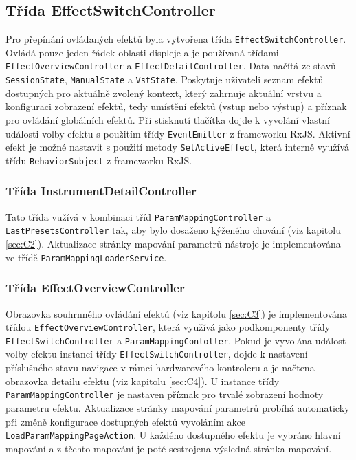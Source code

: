 \documentclass[thesis=M,czech]{FITthesis}[2019/03/06]
\begin{document}
			\subsection{Třída EffectSwitchController}
				Pro přepínání ovládaných efektů byla vytvořena třída \texttt{EffectSwitchController}. 
				Ovládá pouze jeden řádek oblasti displeje a je používaná třídami \texttt{EffectOverviewController} a \texttt{EffectDetailController}. Data načítá ze stavů \texttt{SessionState}, \texttt{ManualState} a \texttt{VstState}.
				Poskytuje uživateli seznam efektů dostupných pro aktuálně zvolený kontext, který zahrnuje aktuální vrstvu a konfiguraci
				zobrazení efektů, tedy umístění efektů (vstup nebo výstup) a příznak pro ovládání globálních efektů.
				Při stisknutí tlačítka dojde k vyvolání vlastní události volby efektu s použitím třídy \texttt{EventEmitter} z frameworku RxJS. Aktivní efekt je možné nastavit s použití metody \texttt{SetActiveEffect}, která interně využívá
				třídu \texttt{BehaviorSubject} z frameworku RxJS.			
							
			\subsubsection{Třída InstrumentDetailController}
				Tato třída vužívá v kombinaci tříd \texttt{ParamMappingController} a \texttt{LastPresetsController} tak, aby bylo dosaženo kýženého chování (viz kapitolu \ref{sec:C2}).
				Aktualizace stránky mapování parametrů nástroje je implementována ve třídě \texttt{ParamMappingLoaderService}.
				
			\subsubsection{Třída EffectOverviewController}
				Obrazovka souhrnného ovládání efektů (viz kapitolu \ref{sec:C3}) je implementována třídou \texttt{EffectOverviewController},
				která využívá jako podkomponenty třídy \texttt{EffectSwitchController} a \texttt{ParamMappingContoller}.
				Pokud je vyvolána událost volby efektu instancí třídy \texttt{EffectSwitchController}, dojde k nastavení příslušného stavu navigace v rámci hardwarového kontroleru a je načtena obrazovka detailu efektu (viz kapitolu \ref{sec:C4}).
				U instance třídy \texttt{ParamMappingController} je nastaven příznak pro trvalé zobrazení hodnoty parametru efektu.
				Aktualizace stránky mapování parametrů probíhá automaticky při změně konfigurace dostupných efektů vyvoláním akce \texttt{LoadParamMappingPageAction}. U každého dostupného efektu je vybráno hlavní mapování a z těchto mapování
				je poté sestrojena výsledná stránka mapování. 			
				
\end{document}
